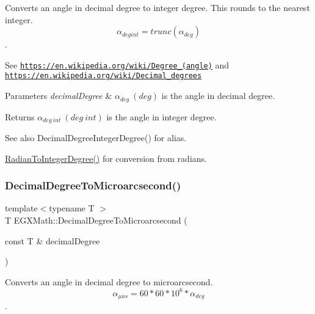 Converts an angle in decimal degree to integer degree. This rounds to the nearest integer. \[\alpha_{deg int}=trunc(\alpha_{deg})\]. 

See \href{https://en.wikipedia.org/wiki/Degree_(angle)}{\tt https\+://en.\+wikipedia.\+org/wiki/\+Degree\+\_\+(angle)} and \href{https://en.wikipedia.org/wiki/Decimal_degrees}{\tt https\+://en.\+wikipedia.\+org/wiki/\+Decimal\+\_\+degrees} 
\begin{DoxyParams}{Parameters}
{\em decimal\+Degree} & $\alpha_{deg}\ (deg)$ is the angle in decimal degree. \\
\hline
\end{DoxyParams}
\begin{DoxyReturn}{Returns}
$\alpha_{deg\ int}\ (deg\ int)$ is the angle in integer degree. 
\end{DoxyReturn}
\begin{DoxySeeAlso}{See also}
Decimal\+Degree\+Integer\+Degree() for alias. 

\mbox{\hyperlink{group___e_g_x_math-_angle_conversions-_radian_gac84796dfdeb56235e1e338522a5f9350}{Radian\+To\+Integer\+Degree()}} for conversion from radians. 
\end{DoxySeeAlso}
\mbox{\label{group___e_g_x_math-_angle_conversions-_decimal_degree_ga6fa88456069907fd24716fa575517571}} 
\subsubsection{\texorpdfstring{Decimal\+Degree\+To\+Microarcsecond()}{DecimalDegreeToMicroarcsecond()}}
{\footnotesize\ttfamily template$<$typename T $>$ \\
T E\+G\+X\+Math\+::\+Decimal\+Degree\+To\+Microarcsecond (\begin{DoxyParamCaption}\item[{const T \&}]{decimal\+Degree }\end{DoxyParamCaption})}



Converts an angle in decimal degree to microarcsecond. \[\alpha_{\mu as}=60 * 60 * 10^6 * \alpha_{deg}\]. 

